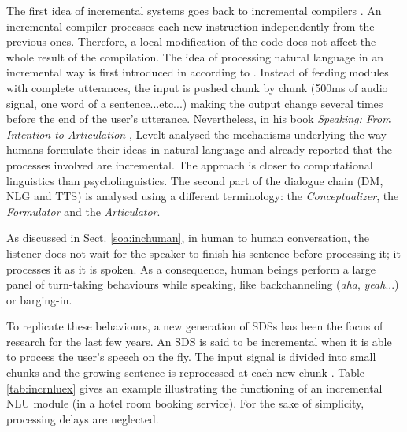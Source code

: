 The first idea of incremental systems goes back to incremental compilers \cite{Lock1965}. An incremental compiler processes each new instruction independently from the previous ones. Therefore, a local modification of the code does not affect the whole result of the compilation. The idea of processing natural language in an incremental way is first introduced in \cite{Wiren1992} according to \cite{Kilger1995}. Instead of feeding modules with complete utterances, the input is pushed chunk by chunk (500ms of audio signal, one word of a sentence...etc...) making the output change several times before the end of the user's utterance. Nevertheless, in his book \textit{Speaking: From Intention to Articulation} \cite{Levelt1989}, Levelt analysed the mechanisms underlying the way humans formulate their ideas in natural language and already reported that the processes involved are incremental. The approach is closer to computational linguistics than psycholinguistics. The second part of the dialogue chain (DM, NLG and TTS) is analysed using a different terminology: the \textit{Conceptualizer}, the \textit{Formulator} and the \textit{Articulator}.

As discussed in Sect. \ref{soa:inchuman}, in human to human conversation, the listener does not wait for the speaker to finish his sentence before processing it; it processes it as it is spoken. As a consequence, human beings perform a large panel of turn-taking behaviours while speaking, like backchanneling (\textit{aha}, \textit{yeah}...) or barging-in.

To replicate these behaviours, a new generation of SDSs has been the focus of research for the last few years. An SDS is said to be incremental when it is able to process the user's speech on the fly. The input signal is divided into small chunks and the growing sentence is reprocessed at each new chunk \cite{Schlangen2011}. Table \ref{tab:incrnluex} gives an example illustrating the functioning of an incremental NLU module (in a hotel room booking service). For the sake of simplicity, processing delays are neglected.

